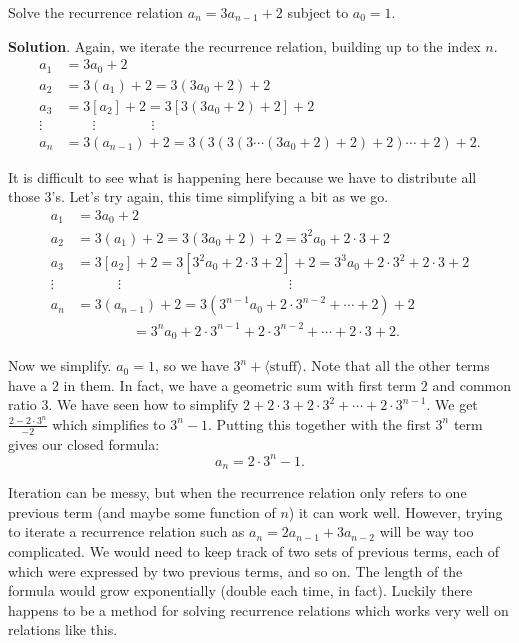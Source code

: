 \documentclass[11pt,]{book}
\theoremstyle{ptxplainnotitle}
\theoremstyle{ptxplaintitle}
\theoremstyle{ptxdefinitionnotitle}
\theoremstyle{ptxdefinitiontitle}
\theoremstyle{ptxdefinitionnotitle}
\theoremstyle{ptxdefinitiontitle}
\theoremstyle{ptxdefinitionnotitle}
\theoremstyle{ptxdefinitiontitle}
\theoremstyle{ptxdefinitiontitlenonumber}
\theoremstyle{ptxdefinitiontitlenonumber}
\numberwithin{equation}{chapter}
\newcommand{\amp}{&}
\begin{document}
\begin{example}\label{example-22}
\hypertarget{p-467}{}%
Solve the recurrence relation \(a_n = 3a_{n-1} + 2\) subject to \(a_0 = 1\).%
\par\smallskip%
\noindent\textbf{Solution}.\hypertarget{solution-63}{}\quad%
\hypertarget{p-468}{}%
Again, we iterate the recurrence relation, building up to the index \(n\).%
\begin{align*}
a_1 \amp = 3a_0 + 2\\
a_2 \amp = 3(a_1) + 2 = 3(3a_0 + 2) + 2\\
a_3 \amp = 3[a_2] + 2 = 3[3(3a_0 + 2) + 2] + 2\\
\vdots \amp \qquad \vdots \qquad \qquad \vdots\\
a_n \amp = 3(a_{n-1}) + 2 = 3(3(3(3\cdots(3a_0 + 2) + 2) + 2)\cdots + 2)+ 2.
\end{align*}
%
\par
\hypertarget{p-469}{}%
It is difficult to see what is happening here because we have to distribute all those 3's. Let's try again, this time simplifying a bit as we go.%
\begin{align*}
a_1 \amp = 3a_0 + 2\\
a_2 \amp = 3(a_1) + 2 = 3(3a_0 + 2) + 2 = 3^2a_0 + 2\cdot 3 + 2\\
a_3 \amp = 3[a_2] + 2 = 3[3^2a_0 + 2\cdot 3 + 2] + 2 = 3^3 a_0 + 2 \cdot 3^2 + 2 \cdot 3 + 2\\
\vdots \amp \qquad\quad \vdots \hspace{2in} \vdots\\
a_n \amp = 3(a_{n-1}) + 2 = 3(3^{n-1}a_0 + 2 \cdot 3^{n-2} + \cdots +2)+ 2\\
\amp \qquad \qquad = 3^n a_0 + 2\cdot 3^{n-1} + 2 \cdot 3^{n-2} + \cdots + 2\cdot 3 + 2.
\end{align*}
%
\par
\hypertarget{p-470}{}%
Now we simplify. \(a_0 = 1\), so we have \(3^n + \langle\text{stuff}\rangle\). Note that all the other terms have a 2 in them. In fact, we have a geometric sum with first term \(2\) and common ratio \(3\). We have seen how to simplify \(2 + 2\cdot 3 + 2 \cdot 3^2 + \cdots + 2\cdot 3^{n-1}\). We get \(\frac{2-2\cdot 3^n}{-2}\) which simplifies to \(3^n - 1\). Putting this together with the first \(3^n\) term gives our closed formula:%
\begin{equation*}
a_n = 2\cdot 3^n - 1.
\end{equation*}
%
\end{example}
\hypertarget{p-471}{}%
Iteration can be messy, but when the recurrence relation only refers to one previous term (and maybe some function of \(n\)) it can work well. However, trying to iterate a recurrence relation such as \(a_n = 2 a_{n-1} + 3 a_{n-2}\) will be way too complicated. We would need to keep track of two sets of previous terms, each of which were expressed by two previous terms, and so on. The length of the formula would grow exponentially (double each time, in fact). Luckily there happens to be a method for solving recurrence relations which works very well on relations like this.%
\typeout{************************************************}
\typeout{************************************************}
\end{document}
